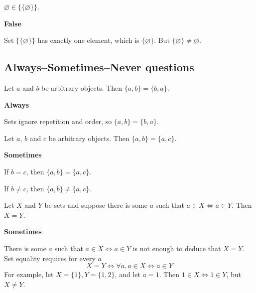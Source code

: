 \begin{chapex}
\label{cqSetsTFEnd}
$\varnothing \in \{ \{ \varnothing \} \}$.
\end{chapex}

\begin{mysolution}
    \textbf{False}

    Set $\{ \{ \varnothing \} \}$ has exactly one element, which is $\{ \varnothing \}$. But $\{ \varnothing \} \ne \varnothing$.
\end{mysolution}

\subsection*{Always--Sometimes--Never questions}


\begin{chapex} %
\label{cqSetsASNBegin}
Let $a$ and $b$ be arbitrary objects. Then $\{ a, b \} = \{ b, a \}$.
\end{chapex}

\begin{mysolution}
    \textbf{Always}

    Sets ignore repetition and order, so $\{ a, b \} = \{ b, a \}$.
\end{mysolution}

\begin{chapex} %
Let $a$, $b$ and $c$ be arbitrary objects. Then $\{ a, b \} = \{ a, c \}$.
\end{chapex}

\begin{mysolution}
    \textbf{Sometimes}

    If $b = c$, then $\{ a, b \} = \{ a, c \}$.

    If $b \ne c$, then $\{ a, b \} \ne \{ a, c \}$.
\end{mysolution}

\begin{chapex} %
Let $X$ and $Y$ be sets and suppose there is some $a$ such that $a \in X \Leftrightarrow a \in Y$. Then $X = Y$.
\end{chapex}

\begin{mysolution}
    \textbf{Sometimes}

    There is some $a$ such that $a \in X \Leftrightarrow a \in Y$ is not enough to deduce that $X=Y$. Set equality requires for every $a$
    \[X=Y \iff \forall a, a \in X \Leftrightarrow a \in Y \]
    For example, let $X=\{1\}, Y=\{1, 2\}$, and let $a=1$. Then $1 \in X \Leftrightarrow 1 \in Y$, but $X \ne Y$.
\end{mysolution}

